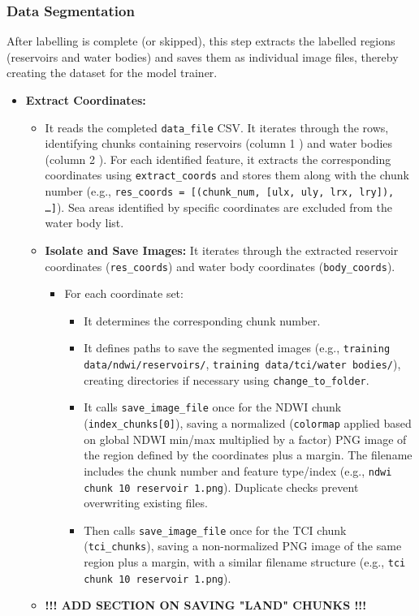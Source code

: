 \subsubsection{Data Segmentation}
After labelling is complete (or skipped), this step extracts the labelled regions (reservoirs and water bodies) and saves them as individual image files, thereby creating the dataset for the model trainer.
\begin{itemize}
    \item \textbf{Extract Coordinates:}
    \begin{itemize}
        \item It reads the completed \verb|data_file| CSV. It iterates through the rows, identifying chunks containing reservoirs (column 1 ) and water bodies (column 2 ). For each identified feature, it extracts the corresponding coordinates using \verb|extract_coords| and stores them along with the chunk number (e.g., \texttt{res\_coords = [(chunk\_num, [ulx, uly, lrx, lry]), \ldots]}). Sea areas identified by specific coordinates are excluded from the water body list.
        \item \textbf{Isolate and Save Images:} It iterates through the extracted reservoir coordinates (\verb|res_coords|) and water body coordinates (\verb|body_coords|).
        \begin{itemize}
            \item For each coordinate set:
            \begin{itemize}
                \item It determines the corresponding chunk number.
                \item It defines paths to save the segmented images (e.g., \texttt{training data/ndwi/reservoirs/}, \texttt{training data/tci/water bodies/}), creating directories if necessary using \verb|change_to_folder|.
                \item It calls \verb|save_image_file| once for the NDWI chunk (\verb|index_chunks[0]|), saving a normalized (\verb|colormap| applied based on global NDWI min/max multiplied by a factor) PNG image of the region defined by the coordinates plus a margin. The filename includes the chunk number and feature type/index (e.g., \verb|ndwi chunk 10 reservoir 1.png|). Duplicate checks prevent overwriting existing files. 
                \item Then calls \verb|save_image_file| once for the TCI chunk (\verb|tci_chunks|), saving a non-normalized PNG image of the same region plus a margin, with a similar filename structure (e.g., \verb|tci chunk 10 reservoir 1.png|).
            \end{itemize}
        \end{itemize}
        \item \textbf{!!! ADD SECTION ON SAVING "LAND" CHUNKS !!!}
    \end{itemize}
\end{itemize}

